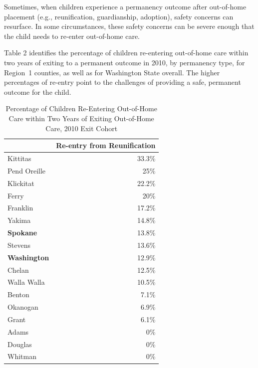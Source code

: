 \documentclass{article}\usepackage[]{graphicx}\usepackage[]{color}
\begin{document}
Sometimes, when children experience a permanency outcome after out-of-home placement (e.g., reunification, guardianship, adoption), safety concerns can resurface. In some circumstances, these safety concerns can be severe enough that the child needs to re-enter out-of-home care.

Table 2 identifies the percentage of children re-entering out-of-home care within two years of exiting to a permanent outcome in 2010, by permanency type, for Region~1 counties, as well as for Washington State overall. The higher percentages of re-entry point to the challenges of providing a safe, permanent outcome for the child.
\vspace{12pt}
\nopagebreak[3]
\begin{table}[ht]
\centering
\caption{Percentage of Children Re-Entering Out-of-Home Care within Two Years of Exiting Out-of-Home Care, 2010 Exit Cohort} 
\begin{tabular}{lr}
  \toprule
 & Re-entry from Reunification \\ 
  \midrule
Kittitas & 33.3\% \\ 
  Pend Oreille & 25\% \\ 
  Klickitat & 22.2\% \\ 
  Ferry & 20\% \\ 
  Franklin & 17.2\% \\ 
  Yakima & 14.8\% \\ 
  \textbf{Spokane} & 13.8\% \\ 
  Stevens & 13.6\% \\ 
  \textbf{Washington} & 12.9\% \\ 
  Chelan & 12.5\% \\ 
  Walla Walla & 10.5\% \\ 
  Benton & 7.1\% \\ 
  Okanogan & 6.9\% \\ 
  Grant & 6.1\% \\ 
  Adams & 0\% \\ 
  Douglas & 0\% \\ 
  Whitman & 0\% \\ 
   \bottomrule
\end{tabular}
\end{table}



\newpage

\end{document}
